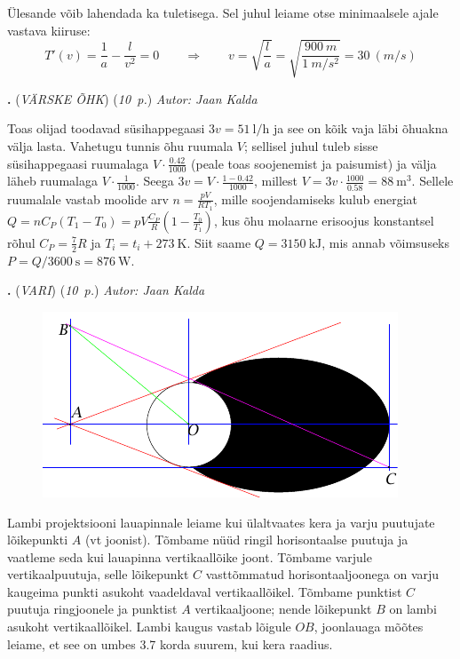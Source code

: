 \documentclass[11pt,a5paper]{article}
\newcommand{\numb}[1]{\vspace{5pt}\textbf{\large #1}}
\newcommand{\nimi}[1]{(\textsl{\small #1})}
\newcommand{\punktid}[1]{(\emph{#1~p.})}
\newcounter{ylesanne}
\newcommand{\yl}[1]{\addtocounter{ylesanne}{1}\numb{\theylesanne.} \nimi{#1} \newblock{}}
\newcommand{\autor}[1]{\emph{ Autor: #1}}%
\begin{document}
Ülesande võib lahendada ka tuletisega. Sel juhul leiame otse minimaalsele ajale vastava kiiruse:
$$
T'(v) = \frac{1}{a}-\frac{l}{v^2} = 0 \qquad \Longrightarrow \qquad v = \sqrt{\frac{l}{a}} = \sqrt{\frac{\SI{900}{m}}{\SI{1}{m/s^2}}} = \SI{30}{(m/s)}
$$



\yl{VÄRSKE ÕHK}
\punktid{10} \autor{Jaan Kalda}

Toas olijad toodavad süsihappegaasi $3v=\SI{51}{\litre\per\hour}$ ja see on kõik vaja läbi õhuakna välja lasta. Vahetugu tunnis õhu ruumala $V$; sellisel juhul tuleb sisse süsihappegaasi ruumalaga $V\cdot \frac{0.42}{1000}$ (peale toas soojenemist ja paisumist) ja välja läheb ruumalaga $V\cdot \frac{1}{1000}$. Seega $3v=V\cdot \frac{1-0.42}{1000}$, millest $V=3v\cdot \frac{1000}{0.58}=\SI{88}{\m\cubed}$. Sellele ruumalale vastab moolide arv $n=\frac{pV}{RT_1}$, mille soojendamiseks kulub energiat $Q=nC_P(T_1-T_0)=pV \frac{C_P}R(1-\frac{T_0}{T_1})$, kus õhu molaarne  erisoojus konstantsel rõhul $C_P=\frac 72R$ ja $T_i=t_i+\SI{273}{\kelvin}$.
Siit saame $Q=\SI{3150}{\kilo\J}$, mis annab võimsuseks $P=Q/\SI{3600}{\s}=\SI{876}\watt$.



\yl{VARI}
\punktid{10} \autor{Jaan Kalda}

\begin{figure}[h]
    \centering
    \includegraphics[width=.7\linewidth]{vari-lah.pdf}
\end{figure}

Lambi projektsiooni lauapinnale leiame kui ülaltvaates kera ja varju puutujate lõikepunkti $A$ (vt joonist). Tõmbame nüüd ringil horisontaalse puutuja ja vaatleme seda kui lauapinna vertikaallõike joont. Tõmbame varjule vertikaalpuutuja, selle lõikepunkt $C$ vasttõmmatud horisontaaljoonega on varju kaugeima punkti asukoht vaadeldaval vertikaallõikel. Tõmbame punktist $C$ puutuja ringjoonele ja punktist $A$ vertikaaljoone; nende lõikepunkt $B$ on lambi asukoht vertikaallõikel. Lambi kaugus vastab lõigule $OB$, joonlauaga mõõtes leiame, et see on umbes \SI{3.7}{} korda suurem, kui kera raadius.
\end{document}
